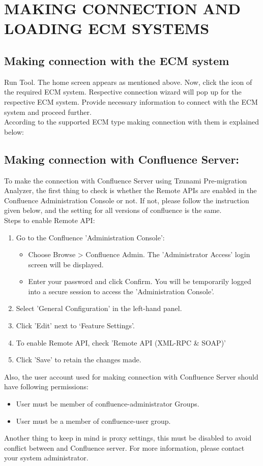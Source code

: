 \section{MAKING CONNECTION AND LOADING ECM SYSTEMS}
\subsection{Making connection with the ECM system}
Run \appName Tool. The home screen appears as mentioned above. Now, click the icon of the required ECM system. Respective connection wizard will pop up for the respective ECM system. Provide necessary information to connect with the ECM system and proceed further.\\
According to the supported ECM type making connection with them is explained below:
\subsection*{Making connection with Confluence Server:}
To make the connection with Confluence Server using Tzunami Pre-migration Analyzer, the first thing to check is whether the Remote APIs are enabled in the Confluence Administration Console or not. If not, please follow the instruction given below, and the setting for all versions of confluence is the same.\\
Steps to enable Remote API:
\begin{enumerate}
	\item Go to the Confluence 'Administration Console':
	\begin{itemize}
		\item Choose Browse > Confluence Admin. The 'Administrator Access' login screen will be displayed.
		\item Enter your password and click Confirm. You will be temporarily logged into a secure session to access the 'Administration Console'.		
	\end{itemize}
	\item Select 'General Configuration' in the left-hand panel.
	\item Click 'Edit' next to ‘Feature Settings’.
	\item To enable Remote API, check 'Remote API (XML-RPC \& SOAP)'
	\item Click 'Save' to retain the changes made.
\end{enumerate}
	Also, the user account used for making connection with Confluence Server should have following permissions:
	\begin{itemize}
		\item User must be member of confluence-administrator Groups.
		\item User must be a member of confluence-user group.
	\end{itemize}
Another thing to keep in mind is proxy settings, this must be disabled to avoid conflict between \appName and Confluence server. For more information, please contact your system administrator.
